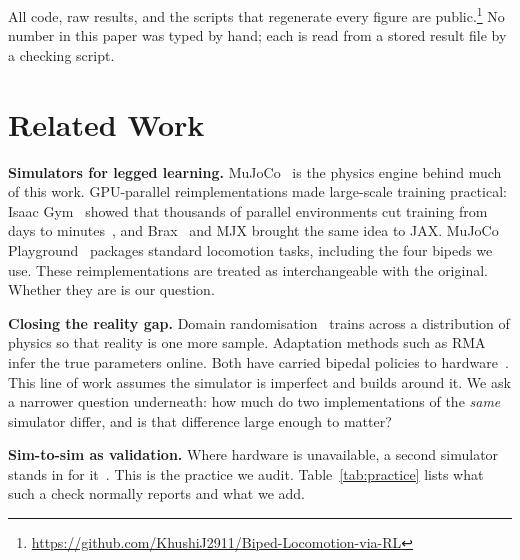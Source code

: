 \documentclass[conference]{IEEEtran}
\begin{document}
All code, raw results, and the scripts that regenerate every figure are
public.\footnote{\url{https://github.com/KhushiJ2911/Biped-Locomotion-via-RL}}
No number in this paper was typed by hand; each is read from a stored
result file by a checking script.

\section{Related Work}

\textbf{Simulators for legged learning.} MuJoCo~\cite{todorov2012mujoco}
is the physics engine behind much of this work. GPU-parallel
reimplementations made large-scale training practical: Isaac
Gym~\cite{makoviychuk2021isaac} showed that thousands of parallel
environments cut training from days to
minutes~\cite{rudin2022learning}, and Brax~\cite{freeman2021brax} and MJX
brought the same idea to JAX. MuJoCo Playground~\cite{zakka2025playground}
packages standard locomotion tasks, including the four bipeds we use.
These reimplementations are treated as interchangeable with the original.
Whether they are is our question.

\textbf{Closing the reality gap.} Domain
randomisation~\cite{tobin2017domain, peng2018sim} trains across a
distribution of physics so that reality is one more sample. Adaptation
methods such as RMA~\cite{kumar2021rma} infer the true parameters online.
Both have carried bipedal policies to
hardware~\cite{siekmann2021sim, radosavovic2024real}. This line of work
assumes the simulator is imperfect and builds around it. We ask a
narrower question underneath: how much do two implementations of the
\emph{same} simulator differ, and is that difference large enough to
matter?

\textbf{Sim-to-sim as validation.} Where hardware is unavailable, a
second simulator stands in for
it~\cite{gu2024humanoidgym, zakka2025playground}. This is the practice we
audit. Table~\ref{tab:practice} lists what such a check normally reports
and what we add.
\end{document}
